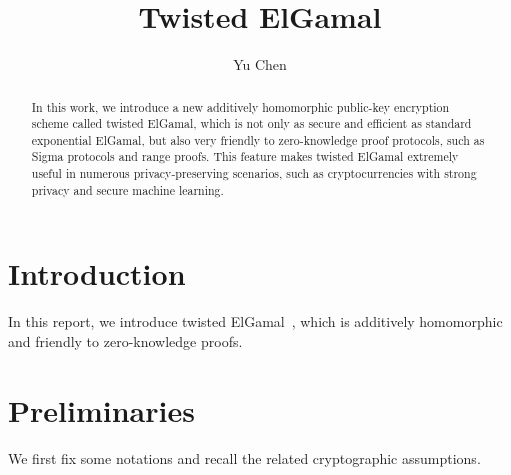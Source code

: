 \documentclass[a4paper,10pt]{article}
\begin{document}
\thispagestyle{empty}

\title{Twisted ElGamal}

\author{Yu Chen\\ {\normalsize {}}}



\date{}

\maketitle

\begin{abstract}
In this work, we introduce a new additively homomorphic public-key encryption scheme called twisted ElGamal,  
which is not only as secure and efficient as standard exponential ElGamal, 
but also very friendly to zero-knowledge proof protocols, such as Sigma protocols and range proofs.    
This feature makes twisted ElGamal extremely useful in numerous privacy-preserving scenarios, 
such as cryptocurrencies with strong privacy and secure machine learning.      
\end{abstract}

\thispagestyle{empty}

\setcounter{tocdepth}{2}
\tableofcontents
\newpage

\pagestyle{plain}
\setcounter{page}{1}

\section{Introduction}
In this report, we introduce twisted ElGamal~\cite{CMT2019}, 
which is additively homomorphic and friendly to zero-knowledge proofs.
 

\section{Preliminaries}
We first fix some notations and recall the related cryptographic assumptions. 
\end{document}
